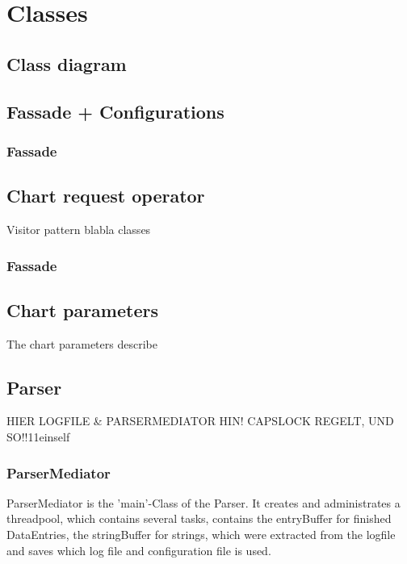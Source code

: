 \section{Classes}

\subsection{Class diagram}

\subsection{Fassade + Configurations}
\subsubsection{Fassade}


\subsection{Chart request operator}
Visitor pattern blabla
classes
\subsubsection{Fassade}

\subsection{Chart parameters}
The chart parameters describe 

\subsection{}


\subsection{Parser}

HIER LOGFILE & PARSERMEDIATOR HIN!
CAPSLOCK REGELT, UND SO!!11einself

\subsubsection*{ParserMediator}
ParserMediator is the 'main'-Class of the Parser. It creates and administrates a threadpool, which contains several tasks, 
contains the entryBuffer for finished DataEntries, the stringBuffer for strings, which were extracted
from the logfile and saves which log file and configuration file is used.

